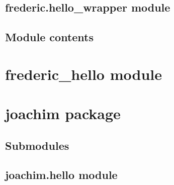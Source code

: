 \documentclass[letterpaper,10pt,english]{sphinxmanual}
\begin{document}
\begin{fulllineitems}
\label{\detokenize{frederic:frederic.hello_world.say}}
\end{fulllineitems}



\subsection{frederic.hello\_wrapper module}
\label{\detokenize{frederic:frederic-hello-wrapper-module}}

\subsection{Module contents}
\label{\detokenize{frederic:module-frederic}}\label{\detokenize{frederic:module-contents}}

\section{frederic\_hello module}
\label{\detokenize{frederic_hello:module-frederic_hello}}\label{\detokenize{frederic_hello:frederic-hello-module}}\label{\detokenize{frederic_hello::doc}}

\section{joachim package}
\label{\detokenize{joachim:joachim-package}}\label{\detokenize{joachim::doc}}

\subsection{Submodules}
\label{\detokenize{joachim:submodules}}

\subsection{joachim.hello module}
\label{\detokenize{joachim:module-joachim.hello}}\label{\detokenize{joachim:joachim-hello-module}}
\end{document}

